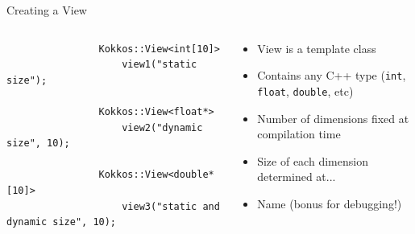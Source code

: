 \documentclass[aspectratio=169]{beamer}
\begin{document}
\begin{frame}[fragile]{Creating a View}
    \begin{columns}
        \begin{column}{0.6\linewidth}
            \begin{verbatim}
                Kokkos::View<int[10]>
                    view1("static size");

                Kokkos::View<float*>
                    view2("dynamic size", 10);

                Kokkos::View<double*[10]>
                    view3("static and dynamic size", 10);
            \end{verbatim}
        \end{column}
        \begin{column}{0.4\linewidth}
            \begin{itemize}
                \item View is a template class
                \item Contains any C++ type (\texttt{int}, \texttt{float}, \texttt{double}, etc)
                \item Number of dimensions fixed at compilation time
                \item Size of each dimension determined at...
                \item Name (bonus for debugging!)
            \end{itemize}
        \end{column}
    \end{columns}
\end{frame}

\end{document}
